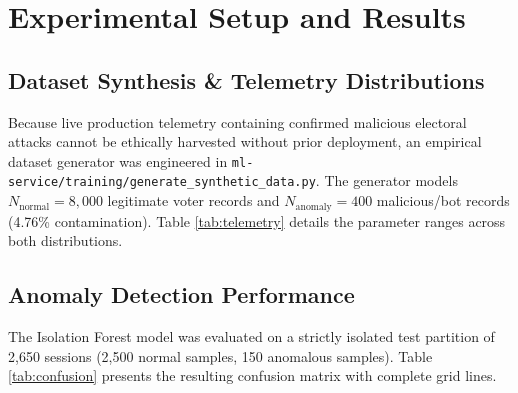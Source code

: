 \documentclass[conference]{IEEEtran}
\begin{document}
\section{Experimental Setup and Results}

\subsection{Dataset Synthesis \& Telemetry Distributions}
Because live production telemetry containing confirmed malicious electoral attacks cannot be ethically harvested without prior deployment, an empirical dataset generator was engineered in \texttt{ml-service/training/generate\_synthetic\_data.py}. The generator models $N_{\text{normal}} = 8,000$ legitimate voter records and $N_{\text{anomaly}} = 400$ malicious/bot records (4.76\% contamination). Table \ref{tab:telemetry} details the parameter ranges across both distributions.

\begin{table}[htbp]
\caption{Telemetry Feature Definitions and Empirical Parameter Ranges}
\label{tab:telemetry}
\centering
\renewcommand{\arraystretch}{1.25}
\end{table}

\subsection{Anomaly Detection Performance}
The Isolation Forest model was evaluated on a strictly isolated test partition of 2,650 sessions (2,500 normal samples, 150 anomalous samples). Table \ref{tab:confusion} presents the resulting confusion matrix with complete grid lines.
\end{document}
